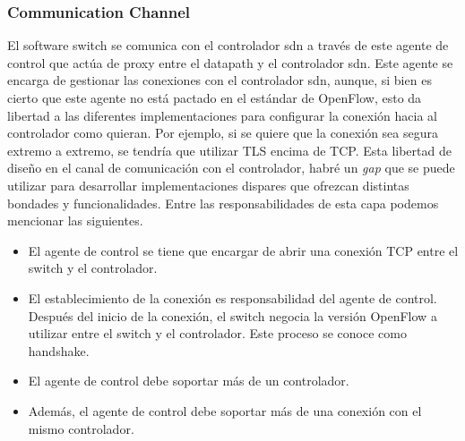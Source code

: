 \subsubsection{Communication Channel}

El software switch se comunica con el controlador \gls{sdn} a través de este agente de control que actúa de proxy entre el datapath y el controlador \gls{sdn}. Este agente se encarga de gestionar las conexiones con el controlador \gls{sdn}, aunque, si bien es cierto que este agente no está pactado en el estándar de OpenFlow, esto da libertad a las diferentes implementaciones para configurar la conexión hacia al controlador como quieran. Por ejemplo, si se quiere que la conexión sea segura extremo a extremo, se tendría que utilizar TLS encima de TCP. Esta libertad de diseño en el canal de comunicación con el controlador, habré un \textit{gap} que se puede utilizar para desarrollar implementaciones dispares que ofrezcan distintas bondades y funcionalidades. Entre las responsabilidades de esta capa podemos mencionar las siguientes.

\begin{itemize}
    \item El agente de control se tiene que encargar de abrir una conexión TCP entre el switch y el controlador.
    \item El establecimiento de la conexión es responsabilidad del agente de control. Después del inicio de la conexión, el switch negocia la versión OpenFlow a utilizar entre el switch y el controlador. Este proceso se conoce como handshake.
    \item El agente de control debe soportar más de un controlador.
    \item Además, el agente de control debe soportar más de una conexión con el mismo controlador.
\end{itemize}